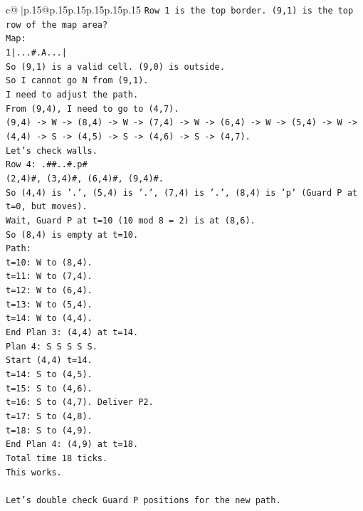 \documentclass{article}
\begin{document}
{\begin{supertabular}{c@{$\;$}|p{.15\linewidth}@{}p{.15\linewidth}p{.15\linewidth}p{.15\linewidth}p{.15\linewidth}p{.15\linewidth}}
{{{\texttt{Row 1 is the top border. (9,1) is the top row of the map area?} \\
\texttt{Map:} \\
\texttt{1|...\#.A...|} \\
\texttt{So (9,1) is a valid cell. (9,0) is outside.} \\
\texttt{So I cannot go N from (9,1).} \\
\texttt{I need to adjust the path.} \\
\texttt{From (9,4), I need to go to (4,7).} \\
\texttt{(9,4) {-}> W {-}> (8,4) {-}> W {-}> (7,4) {-}> W {-}> (6,4) {-}> W {-}> (5,4) {-}> W {-}> (4,4) {-}> S {-}> (4,5) {-}> S {-}> (4,6) {-}> S {-}> (4,7).} \\
\texttt{Let's check walls.} \\
\texttt{Row 4: .\#\#..\#.p\#} \\
\texttt{(2,4)\#, (3,4)\#, (6,4)\#, (9,4)\#.} \\
\texttt{So (4,4) is '.', (5,4) is '.', (7,4) is '.', (8,4) is 'p' (Guard P at t=0, but moves).} \\
\texttt{Wait, Guard P at t=10 (10 mod 8 = 2) is at (8,6).} \\
\texttt{So (8,4) is empty at t=10.} \\
\texttt{Path:} \\
\texttt{t=10: W to (8,4).} \\
\texttt{t=11: W to (7,4).} \\
\texttt{t=12: W to (6,4).} \\
\texttt{t=13: W to (5,4).} \\
\texttt{t=14: W to (4,4).} \\
\texttt{End Plan 3: (4,4) at t=14.} \\
\texttt{Plan 4: S S S S S.} \\
\texttt{Start (4,4) t=14.} \\
\texttt{t=14: S to (4,5).} \\
\texttt{t=15: S to (4,6).} \\
\texttt{t=16: S to (4,7). Deliver P2.} \\
\texttt{t=17: S to (4,8).} \\
\texttt{t=18: S to (4,9).} \\
\texttt{End Plan 4: (4,9) at t=18.} \\
\texttt{Total time 18 ticks.} \\
\texttt{This works.} \\
\\ 
\texttt{Let's double check Guard P positions for the new path.} \\
}}}
\end{supertabular}}
\end{document}
